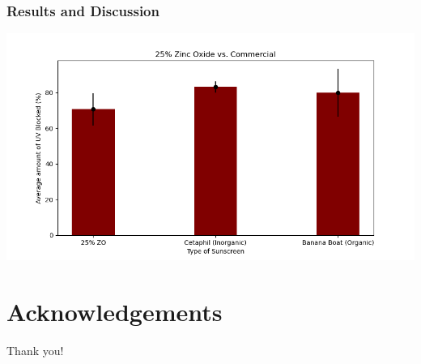 \documentclass[10pt,aspectratio=169]{beamer} %
\begin{document}
\begin{frame}\centering
  \frametitle{Results and Discussion}
  \includegraphics[scale = 0.47]{25ZOvsCommercialPlot.png}
\end{frame}

\section{Acknowledgements}
\begin{frame}\centering\Huge
  Thank you!
\end{frame}
\end{document}

